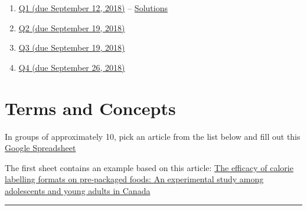 \documentclass[]{book}
\providecommand{\tightlist}{%
  \setlength{\itemsep}{0pt}\setlength{\parskip}{0pt}}
\providecommand{\tightlist}{%
  \setlength{\itemsep}{0pt}\setlength{\parskip}{0pt}}
\theoremstyle{definition}
\theoremstyle{definition}
\theoremstyle{definition}
\theoremstyle{remark}
\begin{document}
\begin{enumerate}
\def\labelenumi{\arabic{enumi}.}
\tightlist
\item
  \href{https://github.com/sahirbhatnagar/EPIB607/raw/master/dalite/001_hist_mean/001-hist-mean.pdf}{Q1
  (due September 12, 2018)} --
  \href{https://github.com/sahirbhatnagar/EPIB607/raw/master/dalite/001_hist_mean/001-hist-mean-sol.pdf}{Solutions}
\item
  \href{https://github.com/sahirbhatnagar/EPIB607/raw/master/dalite/002_box_sd_curves/002-box-sd-curves.pdf}{Q2
  (due September 19, 2018)}
\item
  \href{https://github.com/sahirbhatnagar/EPIB607/raw/master/dalite/003_parameters_samplingdist_CLT/003-parameter-samplingdist-CLT.pdf}{Q3
  (due September 19, 2018)}
\item
  \href{https://github.com/sahirbhatnagar/EPIB607/raw/master/dalite/004_normal_ci/004-normal-ci.pdf}{Q4
  (due September 26, 2018)}
\end{enumerate}

\chapter{Terms and Concepts}\label{terms-and-concepts}

In groups of approximately 10, pick an article from the list below and
fill out this
\href{https://docs.google.com/spreadsheets/d/1Bq10eh3q8aUHuy4VWwBHVud-KAhnm31owKzc0Ie3J24/edit?usp=sharing}{Google
Spreadsheet}

The first sheet contains an example based on this article:
\href{https://www.dropbox.com/s/hg5wk5ea2bg5t5o/CalorieLabellingPackagesFoods.pdf?dl=1}{The
efficacy of calorie labelling formats on pre-packaged foods: An
experimental study among adolescents and young adults in Canada}

\begin{center}\rule{0.5\linewidth}{\linethickness}\end{center}
\end{document}
